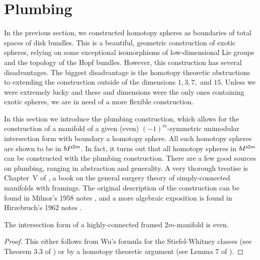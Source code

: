 \pagebreak
\section{Plumbing}\label{sec:plumbing}

In the previous section, we constructed homotopy spheres as boundaries of total spaces of disk bundles. This is a beautiful, geometric construction of exotic spheres, relying on some exceptional isomorphisms of low-dimensional Lie groups and the topology of the Hopf bundles.
However, this construction has several disadvantages.
The biggest disadvantage is the homotopy theoretic obstructions to extending the construction outside of the dimensions $1,3,7,$ and $15$. Unless we were extremely lucky and these and dimensions were the only ones containing exotic spheres, we are in need of a more flexible construction.

In this section we introduce the plumbing construction, which allows for the construction of a manifold of a given (even) $(-1)^m$-symmetric unimodular intersection form with boundary a homotopy sphere. All such homotopy spheres are shown to be in $bP^{2m}$. In fact, it turns out that all homotopy spheres in $bP^{2m}$ can be constructed with the plumbing construction.
There are a few good sources on plumbing, ranging in abstraction and generality. A very thorough treatise is Chapter~V of \cite{browder1972surgery}, a book on the general surgery theory of simply-connected manifolds with framings. The original description of the construction can be found in Milnor's 1958 notes \cite{milnor1958manifolds}, and a more algebraic exposition is found in Hirzebruch's 1962 notes \cite{hirzebruch1971quadratic}.

\begin{proposition}\label{prop:intersection-form-even}
	The intersection form of a highly-connected framed $2m$-manifold is even.
\end{proposition}
\begin{proof}
	This either follows from Wu's formula for the Stiefel-Whitney classes (see Theorem 3.3 of \cite{levine1985lectures}) or by a homotopy theoretic argument (see Lemma 7  of \cite{milnor1961procedure}).
\end{proof}

